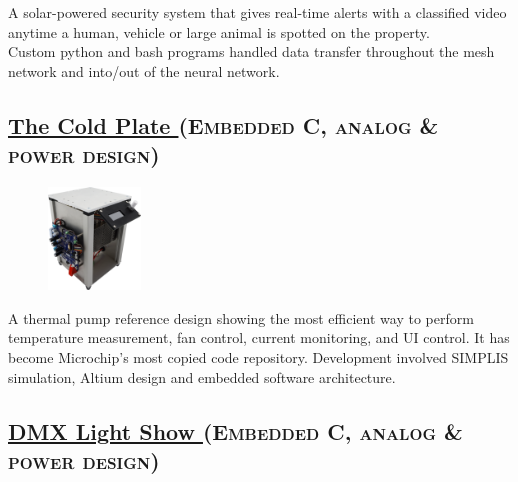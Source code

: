 \documentclass[
	10pt, %
]{FreemanCV}
\begin{document}
\begin{paracol}{2}
A solar-powered security system that gives real-time alerts with a classified video anytime a human, vehicle or large animal is spotted
on the property.\\

Custom python and bash programs handled data transfer throughout the mesh network and into/out of the neural network.

\switchcolumn

\vspace*{-10pt}
\leavevmode \subsection{\href{https://github.com/microchip-pic-avr-examples/pic16f17146-cold-plate-mplab-mcc}{The Cold Plate \linkcolor\scriptsize\faLink}
\hfill
\textsc{\footnotesize{(Embedded C, analog \& power design)}}}

\setlength\intextsep{0pt} %
\begin{figure} %
	\hspace*{-5pt} %
    \includegraphics[width=70pt]{cold_plate} %
\end{figure}

A thermal pump reference design showing the most efficient way to perform temperature measurement, fan control, current monitoring, and UI control.
 It has become Microchip's most copied code repository. Development involved SIMPLIS simulation, Altium design and embedded software architecture.



\vspace*{20pt} %
\leavevmode\subsection{\href{https://github.com/microchip-pic-avr-examples/pic16f56q71-audio-light-show-mplab-mcc}{DMX Light Show \linkcolor\scriptsize\faLink}
\hfill
\textsc{\footnotesize{(Embedded C, analog \& power design)}}}


\end{paracol}
\end{document}
